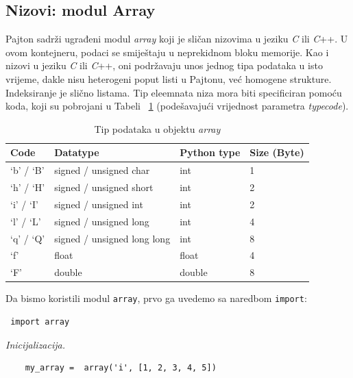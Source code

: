 \subsection{Nizovi: modul Array}

Pajton sadrži ugrađeni modul \textit{array} koji je sličan nizovima u jeziku  \textit{C} ili \textit{C}++. U ovom kontejneru, podaci se smiještaju u neprekidnom bloku memorije. Kao i nizovi u jeziku \textit{C} ili \textit{C}++, oni podržavaju unos jednog tipa podataka u isto vrijeme, dakle nisu heterogeni poput listi u Pajtonu, već homogene strukture. Indeksiranje je slično listama. Tip eleemnata niza mora biti specificiran pomoću koda, koji su pobrojani u Tabeli~ \ref{tab: Tip podataka u objektu array} (podešavajući vrijednost parametra \textit{typecode}). 

\begin{table}[!ht]
	\centering
	\begin{tabular}{llll}  \hline \hline
		Code      & Datatype                  & Python type & Size (Byte) \\ \hline \hline
		`b' / `B' & signed / unsigned char    & int   & 1 \\
		
		`h' / `H'  & signed / unsigned  short  & int   & 2 \\
        `i' / `I'  & signed / unsigned int     & int   & 2 \\
        `l' / `L'  &  signed / unsigned long   & int   & 4 \\
        `q' / `Q'  & signed / unsigned long long & int & 8 \\
        `f'        & float                       & float & 4 \\
         `F'       & double                      & double & 8 \\ \hline \hline
		
	\end{tabular} 
\caption{ Tip podataka u objektu \textit{array}}\label{tab: Tip podataka u objektu array}
\end{table}

Da bismo koristili modul \texttt{array}, prvo ga uvedemo sa naredbom \texttt{import}: 
\begin{verbatim}
 import array 
\end{verbatim}

\textit{Inicijalizacija. } 
\begin{verbatim}
    my_array =  array('i', [1, 2, 3, 4, 5])
\end{verbatim}

